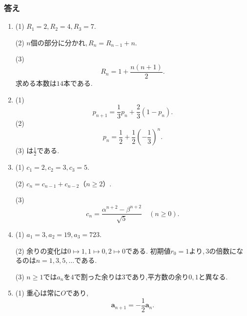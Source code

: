       \subsubsection{答え}\label{節：発展入門：解答}
        \begin{enumerate}[label=\textbf{問\arabic*.},leftmargin=3.8em,format=\bookitemlink{practice-bridge}{answer}{problem}]
          \item (1) $\displaystyle R_1=2,R_2=4,R_3=7$.
                \par\smallskip\noindent
                (2) $\displaystyle n$個の部分に分かれ,\,$\displaystyle R_n=R_{n-1}+n$.
                \par\smallskip\noindent
                (3)
                \[
                  R_n=1+\frac{n(n+1)}2.
                \]
                求める本数は$\displaystyle 14$本である.
          \item (1)
                \[
                  p_{n+1}=\frac13p_n+\frac23(1-p_n).
                \]
                (2)
                \[
                  p_n=\frac12+\frac12\left(-\frac13\right)^n.
                \]
                (3) は$\displaystyle \frac12$である.
          \item (1) $\displaystyle c_1=2,c_2=3,c_3=5$.
                \par\smallskip\noindent
                (2) $\displaystyle c_n=c_{n-1}+c_{n-2}$（$\displaystyle n\ge2$）.
                \par\smallskip\noindent
                (3)
                \[
                  c_n=\frac{\alpha^{n+2}-\beta^{n+2}}{\sqrt5}
                  \quad(n\ge0).
                \]
          \item (1) $\displaystyle a_1=3,a_2=19,a_3=723$.
                \par\smallskip\noindent
                (2) 余りの変化は$\displaystyle 0\mapsto1,1\mapsto0,2\mapsto0$である.
                初期値$\displaystyle r_0=1$より,\,$\displaystyle 3$の倍数になるのは$\displaystyle n=1,3,5,\ldots$である.
                \par\smallskip\noindent
                (3) $\displaystyle n\ge1$では$\displaystyle a_n$を$\displaystyle 4$で割った余りは$\displaystyle 3$であり,平方数の余り$\displaystyle 0,1$と異なる.
          \item (1) 重心は常に$\displaystyle O$であり,
                \[
                  \boldsymbol a_{n+1}=-\frac12\boldsymbol a_n.
                \]

\end{enumerate}
